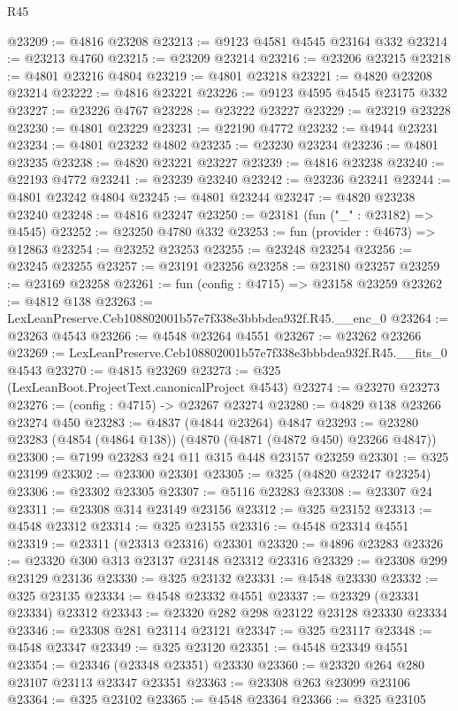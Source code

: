 \begin{lexlean}{R45}
\begin{coremodule}
@23209 := @4816 @23208
@23213 := @9123 @4581 @4545 @23164 @332
@23214 := @23213 @4760
@23215 := @23209 @23214
@23216 := @23206 @23215
@23218 := @4801 @23216 @4804
@23219 := @4801 @23218
@23221 := @4820 @23208 @23214
@23222 := @4816 @23221
@23226 := @9123 @4595 @4545 @23175 @332
@23227 := @23226 @4767
@23228 := @23222 @23227
@23229 := @23219 @23228
@23230 := @4801 @23229
@23231 := @22190 @4772
@23232 := @4944 @23231
@23234 := @4801 @23232 @4802
@23235 := @23230 @23234
@23236 := @4801 @23235
@23238 := @4820 @23221 @23227
@23239 := @4816 @23238
@23240 := @22193 @4772
@23241 := @23239 @23240
@23242 := @23236 @23241
@23244 := @4801 @23242 @4804
@23245 := @4801 @23244
@23247 := @4820 @23238 @23240
@23248 := @4816 @23247
@23250 := @23181 (fun ("_" : @23182) => @4545)
@23252 := @23250 @4780 @332
@23253 := fun (provider : @4673) => @12863
@23254 := @23252 @23253
@23255 := @23248 @23254
@23256 := @23245 @23255
@23257 := @23191 @23256
@23258 := @23180 @23257
@23259 := @23169 @23258
@23261 := fun (config : @4715) => @23158 @23259
@23262 := @4812 @138
@23263 := LexLeanPreserve.Ceb108802001b57e7f338e3bbbdea932f.R45.__enc_0
@23264 := @23263 @4543
@23266 := @4548 @23264 @4551
@23267 := @23262 @23266
@23269 := LexLeanPreserve.Ceb108802001b57e7f338e3bbbdea932f.R45.__fits_0 @4543
@23270 := @4815 @23269
@23273 := @325 (LexLeanBoot.ProjectText.canonicalProject @4543)
@23274 := @23270 @23273
@23276 := (config : @4715) -> @23267 @23274
@23280 := @4829 @138 @23266 @23274 @450
@23283 := @4837 (@4844 @23264) @4847
@23293 := @23280 @23283 (@4854 (@4864 @138)) (@4870 (@4871 (@4872 @450) @23266 @4847))
@23300 := @7199 @23283 @24 @11 @315 @448 @23157 @23259
@23301 := @325 @23199
@23302 := @23300 @23301
@23305 := @325 (@4820 @23247 @23254)
@23306 := @23302 @23305
@23307 := @5116 @23283
@23308 := @23307 @24
@23311 := @23308 @314 @23149 @23156
@23312 := @325 @23152
@23313 := @4548 @23312
@23314 := @325 @23155
@23316 := @4548 @23314 @4551
@23319 := @23311 (@23313 @23316) @23301
@23320 := @4896 @23283
@23326 := @23320 @300 @313 @23137 @23148 @23312 @23316
@23329 := @23308 @299 @23129 @23136
@23330 := @325 @23132
@23331 := @4548 @23330
@23332 := @325 @23135
@23334 := @4548 @23332 @4551
@23337 := @23329 (@23331 @23334) @23312
@23343 := @23320 @282 @298 @23122 @23128 @23330 @23334
@23346 := @23308 @281 @23114 @23121
@23347 := @325 @23117
@23348 := @4548 @23347
@23349 := @325 @23120
@23351 := @4548 @23349 @4551
@23354 := @23346 (@23348 @23351) @23330
@23360 := @23320 @264 @280 @23107 @23113 @23347 @23351
@23363 := @23308 @263 @23099 @23106
@23364 := @325 @23102
@23365 := @4548 @23364
@23366 := @325 @23105

\end{coremodule}
\end{lexlean}
